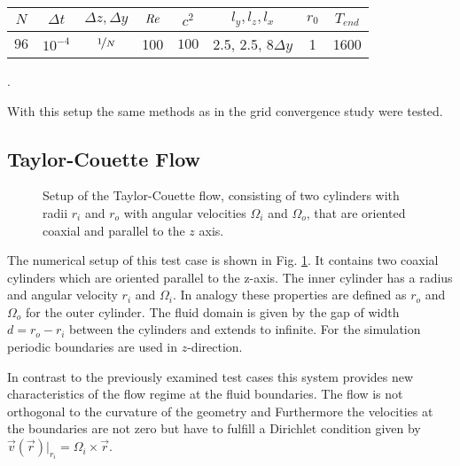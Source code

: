 \begin{center}
\vspace*{0.7ex}
\begin{tabular}{c|c|c|c|c|c|c|c }
 $ N  $                   & $\Delta t$ & $\Delta z, \Delta y$            & $\mbox{\textit{Re}}$  & $c^2$   & $l_y, l_z, l_x $ &$r_0$ & $T_{end}$\\
\hline
 $96 $& $10^{-4}$ & $\nicefrac{1}{N}$ & 100     & $100$   & 2.5, 2.5, $8\Delta y $ & 1     & 1600\\
\end{tabular}.
\vspace*{0.7ex}
\end{center}

With this setup the same methods as in the grid convergence study were tested.

\subsection{Taylor-Couette Flow}

\begin{figure}[!bp]
  \begin{minipage}[c]{0.6\textwidth}
      \centering
  \end{minipage}
  \begin{minipage}[c]{0.3\textwidth}
      \caption{Setup of the Taylor-Couette flow, consisting of  two cylinders with radii $r_i$ and $r_o$ with angular velocities $\Omega_i$ and $\Omega_o$, that are oriented coaxial
       and parallel to the $z$ axis.
      \label{validation:setup_tcflow}
      }
  \end{minipage}
\end{figure}

The numerical setup of this test case is shown in Fig. \ref{validation:setup_tcflow}.
It contains two coaxial cylinders which are oriented parallel to the z-axis.
The inner cylinder has a radius and angular velocity $r_i$ and $\Omega_i$. In analogy these properties are defined as
$r_o$ and $\Omega_o$ for the outer cylinder.
The fluid domain is given by the gap of width $d = r_o - r_i$ between the cylinders and extends to infinite.
For the simulation  periodic boundaries are used in $z$-direction.

In contrast to the previously examined test cases this system provides new characteristics
of the flow regime at the fluid boundaries. The flow is not orthogonal to the curvature of the geometry and
Furthermore the velocities at the boundaries are not zero but have to fulfill  a Dirichlet condition given by
$\vec{v}(\vec{r})|_{r_i}  = \Omega_i \times \vec{r}$.

